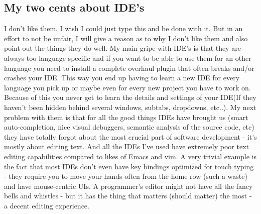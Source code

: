 \documentclass[paper=a4, fontsize=10pt]{scrartcl} %
\numberwithin{equation}{section} %
\numberwithin{figure}{section} %
\numberwithin{table}{section} %
\begin{document}
\subsection{My two cents about IDE's}
I don't like them. I wish I could just type this and be done with it. But in an
effort to not be unfair, I will give a reason as to why I don't like them and also
point out the things they do well. My main gripe with IDE's is that they are
always too language specific and if you want to be able to use them for an other language
you need to install a complete overhaul plugin that often breaks and/or crashes
your IDE. This way you end up having to
learn a new IDE for every language you pick up or maybe even for every new
project you have to work on. Because of this you never get to learn the details
and settings of your IDE(If they haven't been hidden behind several windows, subtabs,
dropdowns, etc..).
\newline
\newline
My next problem with them is that for all the good things IDEs have brought us (smart auto-completion, nice
visual debuggers, semantic analysis of the source code, etc) they have totally
forgot about the most crucial part of software development - it's mostly about
editing text. And all the IDEs I've used have extremely poor text editing
capabilities compared to likes of Emacs and vim. A very trivial example is the
fact that most IDEs don't even have key bindings optimized for touch typing -
they require you to move your hands often from the home row (such a waste) and
have mouse-centric UIs.  A programmer's editor might not have all the fancy
bells and whistles - but it has the thing that matters (should matter) the most
- a decent editing experience.
\end{document}
